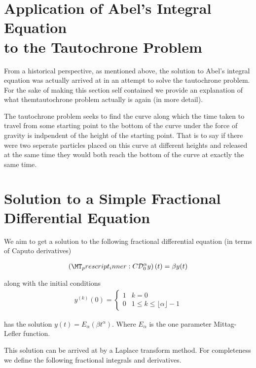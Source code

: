 \documentclass{unswmaths}
\begin{document}
\section*{Application of Abel's Integral Equation \\ to the Tautochrone Problem}

From a historical perspective, as mentioned above, the solution to Abel's integral equation was actually arrived at in an attempt
to solve the tautochrone problem. For the sake of making this section self contained we provide an explanation of what themtautochrone
problem actually is again (in more detail).

The tautochrone problem seeks to find the curve along which the time taken to travel from some starting point
to the bottom of the curve under the force of gravity is indpendent of the height of the starting point. That is to say
if there were two seperate particles placed on this curve at different heights and released at the same time they would
both reach the bottom of the curve at exactly the same time. 

\section*{Solution to a Simple Fractional Differential Equation}
We aim to get a solution to the following fractional differential equation (in terms of Caputo derivatives)

\begin{align}
	\label{eq:fde-1}
	\left( \prescript{C}{}{\mathcal{D}_0^\alpha}y \right)(t) = \beta y(t) 
\end{align}

along with the initial conditions 
\begin{align}
	\label{eq:fde-1-ic}
	y^{(k)}(0) = 
	\begin{cases}
		1 & k = 0 \\
		0 & 1 \leq k \leq \lfloor\alpha \rfloor - 1  
	\end{cases}
\end{align}

has the solution $ y(t) = E_\alpha \left( \beta t^\alpha \right) $. Where $ E_\alpha $ is the one parameter Mittag-Lefler function.

This solution can be arrived at by a Laplace transform method. For completeness we define the following fractional
integrals and derivatives.
\end{document}

